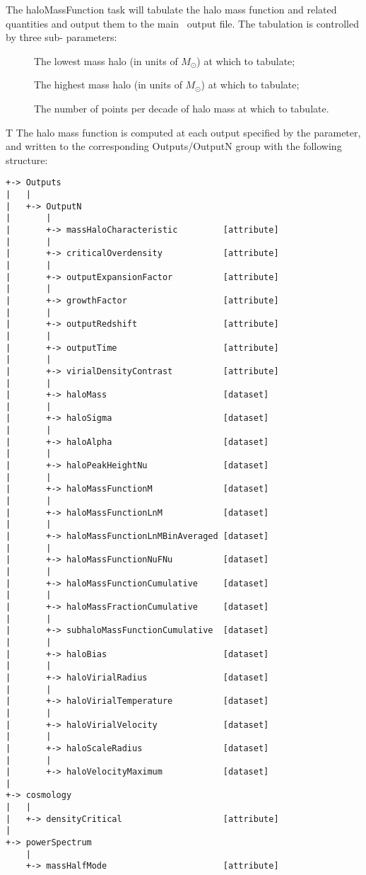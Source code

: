 The {\normalfont \ttfamily haloMassFunction} task will tabulate the halo mass function and related quantities and output them to the main \glc\ output file. The tabulation is controlled by three sub- parameters:
\begin{description}
\item [{\normalfont \ttfamily [haloMassMinimum]}] The lowest mass halo (in units of $M_\odot$) at which to tabulate;
\item [{\normalfont \ttfamily [haloMassMaximum]}] The highest mass halo (in units of $M_\odot$) at which to tabulate;
\item [{\normalfont \ttfamily [pointsPerDecade]}] The number of points per decade of halo mass at which to tabulate.
\end{description}T
The halo mass function is computed at each output specified by the {\normalfont \ttfamily [outputRedshifts]} parameter, and written to the corresponding {\normalfont \ttfamily Outputs/OutputN} group with the following structure:
\begin{verbatim}
+-> Outputs
|   |
|   +-> OutputN
|       |
|       +-> massHaloCharacteristic         [attribute]
|       |
|       +-> criticalOverdensity            [attribute]
|       |
|       +-> outputExpansionFactor          [attribute]
|       |
|       +-> growthFactor                   [attribute]
|       |
|       +-> outputRedshift                 [attribute]
|       |
|       +-> outputTime                     [attribute]
|       |
|       +-> virialDensityContrast          [attribute]
|       |
|       +-> haloMass                       [dataset]
|       |
|       +-> haloSigma                      [dataset]
|       | 
|       +-> haloAlpha                      [dataset]
|       |
|       +-> haloPeakHeightNu               [dataset]
|       |
|       +-> haloMassFunctionM              [dataset]
|       |
|       +-> haloMassFunctionLnM            [dataset]
|       |
|       +-> haloMassFunctionLnMBinAveraged [dataset]
|       |
|       +-> haloMassFunctionNuFNu          [dataset]
|       |
|       +-> haloMassFunctionCumulative     [dataset]
|       |
|       +-> haloMassFractionCumulative     [dataset]
|       |
|       +-> subhaloMassFunctionCumulative  [dataset]
|       |
|       +-> haloBias                       [dataset]
|       |
|       +-> haloVirialRadius               [dataset]
|       |
|       +-> haloVirialTemperature          [dataset]
|       |
|       +-> haloVirialVelocity             [dataset]
|       |
|       +-> haloScaleRadius                [dataset]
|       |
|       +-> haloVelocityMaximum            [dataset]
|    
+-> cosmology
|   |
|   +-> densityCritical                    [attribute]
|    
+-> powerSpectrum
    |
    +-> massHalfMode                       [attribute]
\end{verbatim}
